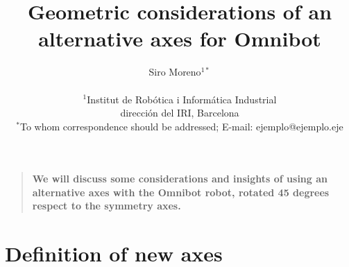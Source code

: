 \documentclass[12pt]{article}
\title{Geometric considerations of an alternative axes for Omnibot}
\author
{Siro Moreno$^{1\ast}$ \\
\\
\normalsize{$^{1}$Institut de Robótica i Informática Industrial}\\
\normalsize{dirección del IRI, Barcelona}\\
\normalsize{$^\ast$To whom correspondence should be addressed; E-mail:  ejemplo@ejemplo.eje}
}
\date{}
\newenvironment{sciabstract}{%
\begin{quote} \bf}
{\end{quote}}
\begin{document}
 


\baselineskip24pt


\maketitle 




\begin{sciabstract}
  We will discuss some considerations and insights of using an alternative axes with the Omnibot robot, rotated 45 degrees respect to the symmetry axes.
\end{sciabstract}




\section*{Definition of new axes}
\end{document}
